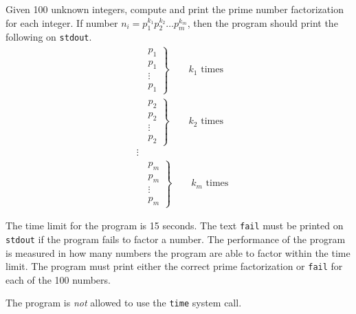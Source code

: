 Given 100 unknown integers, compute and print the prime number factorization 
for each integer. If number $n_i = p_1^{k_1}p_2^{k_2} \ldots p_m^{k_m}$, then
the program should print the following on \texttt{stdout}.
\begin{align*}
&\left.\begin{aligned}
      &p_1 \\
      &p_1 \\
      &\vdots \\
      &p_1 
      \end{aligned}
\right\}
\qquad k_1 \text{ times} \\
&\left.\begin{aligned}
      &p_2 \\
      &p_2 \\
      &\vdots \\
      &p_2 
      \end{aligned}
\right\}
\qquad k_2 \text{ times} \\
&\vdots \\
&\left.\begin{aligned}
      &p_m \\
      &p_m \\
      &\vdots \\
      &p_m 
      \end{aligned}
\right\}
\qquad k_m \text{ times}
\end{align*}

The time limit for the program is 15 seconds. The text \texttt{fail} must be
printed on \texttt{stdout} if the program fails to factor a number. 
The performance of the program is measured in how many numbers the program are
able to factor within the time limit. The program must print either the correct
prime factorization or \texttt{fail} for each of the 100 numbers.

The program is \emph{not} allowed to use the \texttt{time} system call.
